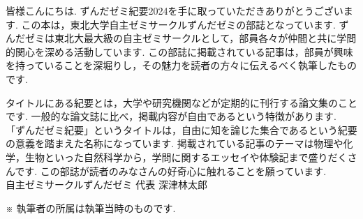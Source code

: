 %

皆様こんにちは. 
ずんだゼミ紀要2024を手に取っていただきありがとうございます. 
この本は，東北大学自主ゼミサークルずんだゼミの部誌となっています. 
ずんだゼミは東北大最大級の自主ゼミサークルとして，部員各々が仲間と共に学問的関心を深める活動しています. 
この部誌に掲載されている記事は，部員が興味を持っていることを深堀りし，その魅力を読者の方々に伝えるべく執筆したものです. 

タイトルにある紀要とは，大学や研究機関などが定期的に刊行する論文集のことです. 
一般的な論文誌に比べ，掲載内容が自由であるという特徴があります. 
「ずんだゼミ紀要」というタイトルは，自由に知を論じた集合であるという紀要の意義を踏まえた名称になっています. 
掲載されている記事のテーマは物理や化学，生物といった自然科学から，学問に関するエッセイや体験記まで盛りだくさんです. 
この部誌が読者のみなさんの好奇心に触れることを願っています. \\

自主ゼミサークルずんだゼミ 代表 深津林太郎

\vspace{2cm}

※ 執筆者の所属は執筆当時のものです.






